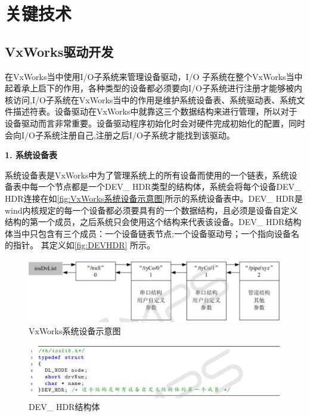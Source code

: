 	


\section{关键技术}

\subsection{VxWorks驱动开发}
	
	在VxWorks当中使用I/O子系统来管理设备驱动，I/O 子系统在整个VxWorks当中起着承上启下的作用，各种类型的设备都必须要向I/O子系统进行注册才能够被内核访问,I/O子系统在VxWorks当中的作用是维护系统设备表、系统驱动表、系统文件描述符表\cite{VxWorks内核解读}\cite{曹桂平2011VxWorks}。设备驱动在VxWorks中就靠这三个数据结构来进行管理，所以对于设备驱动而言非常重要。设备驱动程序初始化时会对硬件完成初始化的配置，同时会向I/O子系统注册自己,注册之后I/O子系统才能找到该驱动。

\noindent \textbf{1. 系统设备表}

	系统设备表是VxWorks中为了管理系统上的所有设备而使用的一个链表，系统设备表中每一个节点都是一个DEV\_ HDR类型的结构体，系统会将每个设备DEV\_ HDR连接在如\autoref{fig:VxWorks系统设备示意图}所示的系统设备表中。DEV\_ HDR是wind内核规定的每一个设备都必须要具有的一个数据结构，且必须是设备自定义结构的第一个成员，之后系统只会使用这个结构来代表该设备。DEV\_ HDR结构体当中只包含有三个成员：一个设备链表节点;一个设备驱动号；一个指向设备名的指针。
	其定义如\autoref{fig:DEVHDR} 所示。

\begin{figure}[!h]
\centering
\includegraphics[width=1.0\textwidth]{./graphics/vxworks-device-link.pdf}
\caption{VxWorks系统设备示意图}\label{fig:VxWorks系统设备示意图}
\end{figure}
	
\begin{figure}[!h]
\centering
\includegraphics[width=1.0\textwidth]{./graphics/DEVHDR.pdf}
\caption{DEV\_ HDR结构体}\label{fig:DEVHDR}
\end{figure}

